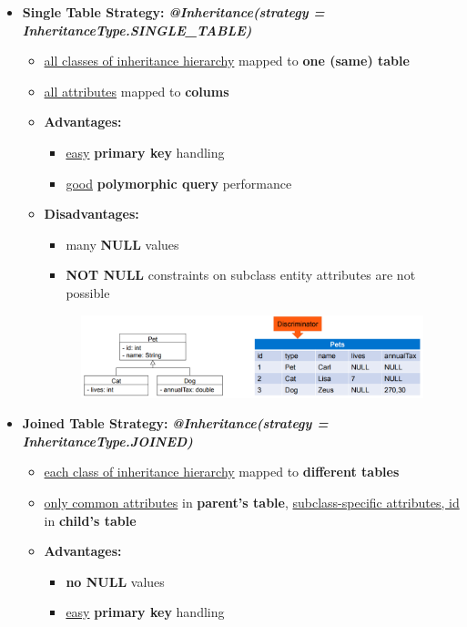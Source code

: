 \documentclass[ieeetran]{article}
\begin{document}
\begin{itemize}
	\begin{itemize}
	  \item \textbf{Single Table Strategy:} \textbf{\textit{@Inheritance(strategy = InheritanceType.SINGLE\_TABLE)}}
		  \begin{itemize}
		    \item \underline{all classes of inheritance hierarchy} mapped to \textbf{one (same) table}
			    \item \underline{all attributes} mapped to \textbf{colums}

				 \item \textbf{Advantages:}
					 \begin{itemize}
					   \item \underline{easy} \textbf{primary key} handling
				\item \underline{good} \textbf{polymorphic query} performance
					 \end{itemize}
\item \textbf{Disadvantages:}
	\begin{itemize}
	  \item many \textbf{NULL} values
	\item \textbf{NOT NULL} constraints on subclass entity attributes are not possible

	\end{itemize}
	\begin{figure}[h!]
	  \centering
	  \includegraphics[width=0.7\linewidth]{singletable.png}
	  \label{fig:singletable_png}
	\end{figure}
		  \end{itemize}


\item \textbf{Joined Table Strategy:} \textit{\textbf{@Inheritance(strategy = InheritanceType.JOINED)}}
	\begin{itemize}
	  \item \underline{each class of inheritance hierarchy} mapped to \textbf{different tables}

	  \item \underline{only common attributes} in \textbf{parent's table}, \underline{subclass-specific attributes, id} in \textbf{child's table}
	\item \textbf{Advantages:}
		\begin{itemize}
		  \item \textbf{no NULL} values
		\item \underline{easy} \textbf{primary key} handling


\end{itemize}
\end{itemize}
\end{itemize}
\end{itemize}
\end{document}
